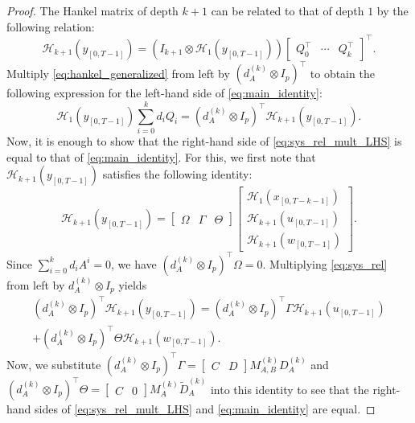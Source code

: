 \documentclass[journal,twoside,web]{ieeecolor}
\begin{document}
\begin{proof}
The Hankel matrix of depth $k+1$ can be related to that of depth $1$ by the following relation:
\begin{equation}
\label{eq:hankel_generalized}
\mathcal{H}_{k+1}(y_{[0,T-1]})\!=\!(I_{{k+1}}\!\otimes\! \mathcal{H}_1(y_{[0,T-1]}))\!\begin{bmatrix}
Q_0^\top \!\!&\!\! \cdots \!\!&\!\! Q_{k}^\top
\end{bmatrix}^\top\!\!\!. 
\end{equation}
Multiply \eqref{eq:hankel_generalized} from left by $(d_A^{(k)}\otimes I_{p})^\top$ to obtain the following expression for the left-hand side of \eqref{eq:main_identity}:
\begin{equation}
\label{eq:sys_rel_mult_LHS}
\mathcal{H}_1(y_{[0,T-1]})\sum_{i=0}^{k}d_iQ_i=(d_A^{(k)}\otimes I_{p})^\top\mathcal{H}_{k+1}(y_{[0,T-1]}).
\end{equation}
Now, it is enough to show that the right-hand side of \eqref{eq:sys_rel_mult_LHS} is equal to that of \eqref{eq:main_identity}. For this, we first note that $\mathcal{H}_{k+1}(y_{[0,T-1]})$ satisfies the following identity:
\begin{equation}
\label{eq:sys_rel}
\mathcal{H}_{k+1}(y_{[0,T-1]})=\begin{bmatrix}
\Omega & \Gamma & \Theta
\end{bmatrix}\begin{bmatrix}
\mathcal{H}_1(x_{[0,T-k-1]}) \\
\mathcal{H}_{k+1}(u_{[0,T-1]}) \\
\mathcal{H}_{k+1}(w_{[0,T-1]})
\end{bmatrix}.
\end{equation}
Since $\sum_{i=0}^k d_iA^i=0$, we have $(d_A^{(k)}\otimes I_{p})^\top\Omega=0$. Multiplying \eqref{eq:sys_rel} from left by $d_A^{(k)}\otimes I_{p}$ yields
\begin{equation}
\label{eq:sys_rel_mult}
\begin{split}
(d_A^{(k)}\otimes I_{p})^\top\mathcal{H}_{k+1}(y_{[0,T-1]})=(d_A^{(k)}\otimes I_{p})^\top\Gamma \mathcal{H}_{k+1}(u_{[0,T-1]})\\
+(d_A^{(k)}\otimes I_{p})^\top\Theta\mathcal{H}_{k+1}(w_{[0,T-1]}).
\end{split}
\end{equation}
Now, we substitute $(d_A^{(k)}\otimes I_{p})^\top\Gamma=\begin{bmatrix}
C & D
\end{bmatrix}M_{A,B}^{(k)}D_A^{(k)}$ and $(d_A^{(k)}\otimes I_{p})^\top\Theta=\begin{bmatrix}
C & 0
\end{bmatrix}M_{A}^{(k)}\tilde{D}_A^{(k)}$ into this identity to see that the right-hand sides of \eqref{eq:sys_rel_mult_LHS} and \eqref{eq:main_identity} are equal.
\end{proof}
\end{document}
